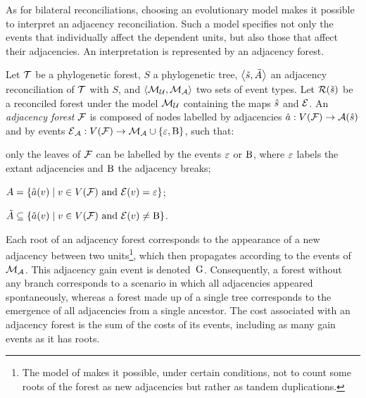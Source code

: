 As for bilateral reconciliations, choosing an evolutionary model makes it possible to interpret an adjacency reconciliation.
Such a model specifies not only the events that individually affect the dependent units, but also those that affect their adjacencies.
An interpretation is represented by an adjacency forest.

\begin{definition}\label{definition:adjrectree}
    Let \(\mathcal{T}\) be a phylogenetic forest, \(S\) a phylogenetic tree, \(\left\langle\tilde{s}, \tilde{A}\right\rangle\) an adjacency reconciliation of \(\mathcal{T}\) with \(S\), and \(\left\langle\mathcal{M}\mathcal{_U}, \mathcal{M}\mathcal{_A}\right\rangle\) two sets of event types.
    Let \(\mathcal{R}(\tilde{s})\) be a reconciled forest under the model \(\mathcal{M}\mathcal{_U}\) containing the maps \(\hat{s}\) and \(\mathcal{E}\).
    An \emph{adjacency forest} \(\mathcal{F}\) is composed of nodes
        labelled by adjacencies
        \(\hat{a} : V(\mathcal{F}) \rightarrow \mathcal{A}(\hat{s})\)
        and by events
        \(\mathcal{E}\mathcal{_A} : V(\mathcal{F}) \rightarrow \mathcal{M}\mathcal{_A} \cup \{\varepsilon, \mathrm{B}\}\),
        such that:
    \begin{condition}
        \item only the leaves of \(\mathcal{F}\) can be labelled by the events \(\varepsilon\) or \(\mathrm{B}\), where \(\varepsilon\) labels the extant adjacencies and \(\mathrm{B}\) the adjacency breaks;
        \item \(A = \{\hat{a}(v) \mid v \in V(\mathcal{F})
            \text{ and } \mathcal{E}(v) = \varepsilon \}\);
        \item \(\tilde{A} \subseteq \{\hat{a}(v) \mid v \in V(\mathcal{F})
            \text{ and } \mathcal{E}(v) \neq \mathrm{B} \}\). \qedhere
    \end{condition}
\end{definition}

Each root of an adjacency forest corresponds to the appearance of a new adjacency between two units\footnote{The model of \textcite{Berard2012EvolutionGeneNeighborhoods} makes it possible, under certain conditions, not to count some roots of the forest as new adjacencies but rather as tandem duplications.}, which then propagates according to the events of \(\mathcal{M}\mathcal{_A}\).
This adjacency gain event is denoted~\(\mathrm{G}\).
Consequently, a forest without any branch corresponds to a scenario in which all adjacencies appeared spontaneously, whereas a forest made up of a single tree corresponds to the emergence of all adjacencies from a single ancestor.
The cost associated with an adjacency forest is the sum of the costs of its events, including as many gain events as it has roots.

